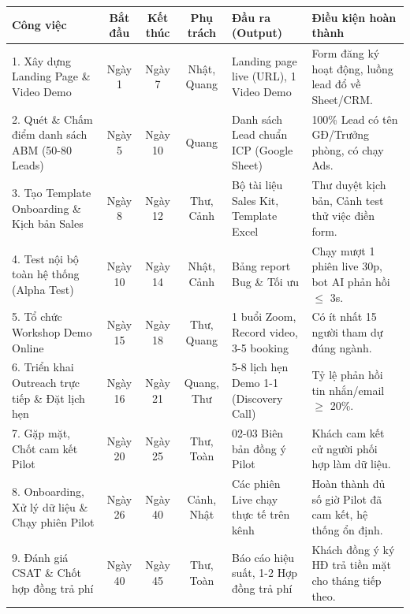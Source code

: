 \begin{table}[H]
    \centering
    \footnotesize
    \renewcommand{\arraystretch}{1.4}
    \begin{tabularx}{\linewidth}{|p{3.5cm}|c|c|c|X|X|}
        \hline
        \rowcolor{softBlue}
        \textbf{Công việc} & \textbf{Bắt đầu} & \textbf{Kết thúc} & \textbf{Phụ trách} & \textbf{Đầu ra (Output)} & \textbf{Điều kiện hoàn thành} \\ \hline
        
        1. Xây dựng Landing Page \& Video Demo & Ngày 1 & Ngày 7 & Nhật, Quang & Landing page live (URL), 1 Video Demo & Form đăng ký hoạt động, luồng lead đổ về Sheet/CRM. \\ \hline
        
        2. Quét \& Chấm điểm danh sách ABM (50-80 Leads) & Ngày 5 & Ngày 10 & Quang & Danh sách Lead chuẩn ICP (Google Sheet) & 100\% Lead có tên GĐ/Trưởng phòng, có chạy Ads. \\ \hline
        
        3. Tạo Template Onboarding \& Kịch bản Sales & Ngày 8 & Ngày 12 & Thư, Cảnh & Bộ tài liệu Sales Kit, Template Excel & Thư duyệt kịch bản, Cảnh test thử việc điền form. \\ \hline
        
        4. Test nội bộ toàn hệ thống (Alpha Test) & Ngày 10 & Ngày 14 & Nhật, Cảnh & Bảng report Bug \& Tối ưu & Chạy mượt 1 phiên live 30p, bot AI phản hồi $\le$ 3s. \\ \hline
        
        5. Tổ chức Workshop Demo Online & Ngày 15 & Ngày 18 & Thư, Quang & 1 buổi Zoom, Record video, 3-5 booking & Có ít nhất 15 người tham dự đúng ngành. \\ \hline
        
        6. Triển khai Outreach trực tiếp \& Đặt lịch hẹn & Ngày 16 & Ngày 21 & Quang, Thư & 5-8 lịch hẹn Demo 1-1 (Discovery Call) & Tỷ lệ phản hồi tin nhắn/email $\ge$ 20\%. \\ \hline
        
        7. Gặp mặt, Chốt cam kết Pilot & Ngày 20 & Ngày 25 & Thư, Toàn & 02-03 Biên bản đồng ý Pilot & Khách cam kết cử người phối hợp làm dữ liệu. \\ \hline
        
        8. Onboarding, Xử lý dữ liệu \& Chạy phiên Pilot & Ngày 26 & Ngày 40 & Cảnh, Nhật & Các phiên Live chạy thực tế trên kênh & Hoàn thành đủ số giờ Pilot đã cam kết, hệ thống ổn định. \\ \hline
        
        9. Đánh giá CSAT \& Chốt hợp đồng trả phí & Ngày 40 & Ngày 45 & Thư, Toàn & Báo cáo hiệu suất, 1-2 Hợp đồng trả phí & Khách đồng ý ký HĐ trả tiền mặt cho tháng tiếp theo. \\ \hline
    \end{tabularx}
\end{table}

